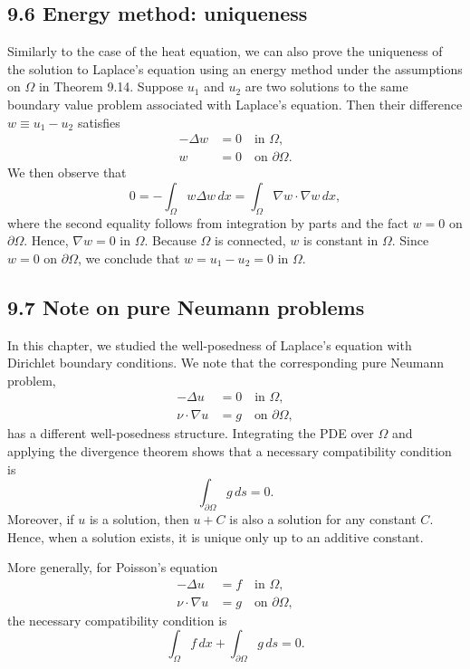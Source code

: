 \subsection{9.6 Energy method: uniqueness}
Similarly to the case of the heat equation, we can also prove the uniqueness of the solution to Laplace's equation using an energy method under the assumptions on $\Omega$ in Theorem 9.14. Suppose $u_1$ and $u_2$ are two solutions to the same boundary value problem associated with Laplace's equation. Then their difference $w \equiv u_1 - u_2$ satisfies
\begin{align*}
    -\Delta w &= 0 \quad \text{in } \Omega, \\
    w &= 0 \quad \text{on } \partial\Omega.
\end{align*}
We then observe that
\[0 = -\int_\Omega w\Delta w\,dx = \int_\Omega \nabla w \cdot \nabla w\,dx,\]
where the second equality follows from integration by parts and the fact $w = 0$ on $\partial\Omega$. Hence, $\nabla w = 0$ in $\Omega$. Because $\Omega$ is connected, $w$ is constant in $\Omega$. Since $w = 0$ on $\partial\Omega$, we conclude that $w = u_1 - u_2 = 0$ in $\Omega$.

\subsection{9.7 Note on pure Neumann problems}
In this chapter, we studied the well-posedness of Laplace's equation with Dirichlet boundary conditions. We note that the corresponding pure Neumann problem,
\begin{align*}
    -\Delta u &= 0 \quad \text{in } \Omega, \\
    \nu \cdot \nabla u &= g \quad \text{on } \partial\Omega,
\end{align*}
has a different well-posedness structure. Integrating the PDE over $\Omega$ and applying the divergence theorem shows that a necessary compatibility condition is
\[\int_{\partial\Omega} g\,ds = 0.\]
Moreover, if $u$ is a solution, then $u + C$ is also a solution for any constant $C$. Hence, when a solution exists, it is unique only up to an additive constant.

More generally, for Poisson's equation
\begin{align*}
    -\Delta u &= f \quad \text{in } \Omega, \\
    \nu \cdot \nabla u &= g \quad \text{on } \partial\Omega,
\end{align*}
the necessary compatibility condition is
\[\int_\Omega f\,dx + \int_{\partial\Omega} g\,ds = 0.\]

